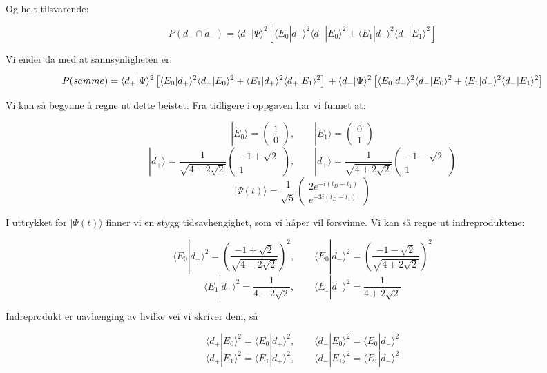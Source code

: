 \documentclass[a4paper,norsk, 10pt]{article}
\numberwithin{equation}{section}
\begin{document}
Og helt tilsvarende:

$$
P(d_- \cap d_-) = \langle d_-|\Psi\rangle^2\left[\langle E_0|d_-\rangle^2\langle d_-|E_0\rangle^2 + \langle E_1|d_-\rangle^2\langle d_-|E_1\rangle^2\right]
$$

Vi ender da med at sannsynligheten er:

$$
P(samme) = \langle d_+|\Psi\rangle^2\left[\langle E_0|d_+\rangle^2\langle d_+|E_0\rangle^2 + \langle E_1|d_+\rangle^2\langle d_+|E_1\rangle^2\right] \\
+
 \langle d_-|\Psi\rangle^2\left[\langle E_0|d_-\rangle^2\langle d_-|E_0\rangle^2 + \langle E_1|d_-\rangle^2\langle d_-|E_1\rangle^2\right]
$$

Vi kan så begynne å regne ut dette beistet. Fra tidligere i oppgaven har vi funnet at:

$$
|E_0\rangle = 
\begin{pmatrix}
1\\0
\end{pmatrix}
, \qquad
|E_1\rangle = 
\begin{pmatrix}
0\\1
\end{pmatrix}
$$
$$
|d_+\rangle = 
\frac{1}{\sqrt{4-2\sqrt{2}}}
\begin{pmatrix}
-1+\sqrt{2}\\1
\end{pmatrix}
,\qquad
|d_+\rangle = 
\frac{1}{\sqrt{4+2\sqrt{2}}}
\begin{pmatrix}
-1-\sqrt{2}\\1
\end{pmatrix}
$$
$$
|\Psi(t)\rangle = \frac{1}{\sqrt{5}}
\begin{pmatrix}
2e^{-i(t_D-t_1)} \\ e^{-3i(t_D-t_1)}
\end{pmatrix}
$$

I uttrykket for $|\Psi(t)\rangle$ finner vi en stygg tidsavhengighet, som vi håper vil forsvinne. Vi kan så regne ut indreproduktene:

$$
\langle E_0|d_+\rangle^2 = \left(\frac{-1 + \sqrt{2}}{\sqrt{4-2\sqrt{2}}}\right)^2, \qquad \langle E_0|d_-\rangle^2 = \left(\frac{-1 - \sqrt{2}}{\sqrt{4+2\sqrt{2}}}\right)^2
$$
$$
\langle E_1|d_+\rangle^2 = \frac{1}{4-2\sqrt{2}} ,\qquad \langle E_1|d_-\rangle^2 = \frac{1}{4+2\sqrt{2}} 
$$

Indreprodukt er uavhenging av hvilke vei vi skriver dem, så

$$
\langle d_+|E_0\rangle^2 = \langle E_0|d_+\rangle^2 ,\qquad \langle d_-|E_0\rangle^2 = \langle E_0|d_-\rangle^2
$$
$$
\langle d_+|E_1\rangle^2 = \langle E_1|d_+\rangle^2 ,\qquad \langle d_-|E_1\rangle^2 = \langle E_1|d_-\rangle^2
$$
\end{document}
